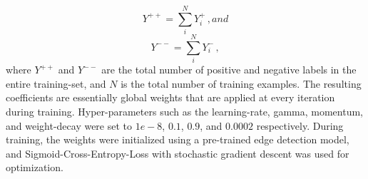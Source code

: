\begin{equation}
\label{eq:eq3}
Y^{++} = \sum_{i}^{N}Y^{+}_{i} \,,and
\end{equation}
\begin{equation}
\label{eq:eq3}
Y^{--} = \sum_{i}^{N}Y^{-}_{i} \,,
\end{equation}
where $Y^{++}$ and $Y^{--}$ are the total number of positive and negative labels in the entire training-set, and $N$ is the total number of training examples. The resulting  coefficients are essentially global weights that are applied at every iteration during training. Hyper-parameters such as the learning-rate, gamma, momentum, and weight-decay were set to $1e-8$, $0.1$, $0.9$, and $0.0002$ respectively. During training, the weights were initialized using a pre-trained edge detection model, and Sigmoid-Cross-Entropy-Loss with stochastic gradient descent was used for optimization.

